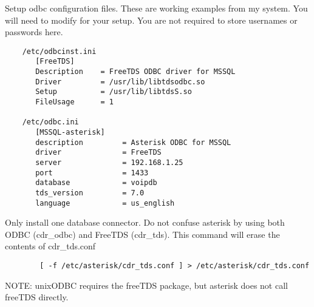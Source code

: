 	Setup odbc configuration files.  These are working examples
	from my system.  You will need to modify for your setup.
	You are not required to store usernames or passwords here.
\begin{astlisting}
\begin{verbatim}
	/etc/odbcinst.ini
	   [FreeTDS]
	   Description    = FreeTDS ODBC driver for MSSQL
	   Driver         = /usr/lib/libtdsodbc.so
	   Setup          = /usr/lib/libtdsS.so
	   FileUsage      = 1

	/etc/odbc.ini
	   [MSSQL-asterisk]
	   description         = Asterisk ODBC for MSSQL
	   driver              = FreeTDS
	   server              = 192.168.1.25
	   port                = 1433
	   database            = voipdb
	   tds_version         = 7.0
	   language            = us_english
\end{verbatim}
\end{astlisting}

		Only install one database connector.  Do not confuse asterisk
		by using both ODBC (cdr\_odbc) and FreeTDS (cdr\_tds).
		This command will erase the contents of cdr\_tds.conf
\begin{astlisting}
\begin{verbatim}
		[ -f /etc/asterisk/cdr_tds.conf ] > /etc/asterisk/cdr_tds.conf
\end{verbatim}
\end{astlisting}
		NOTE:  unixODBC requires the freeTDS package, but asterisk does
		not call freeTDS directly.


